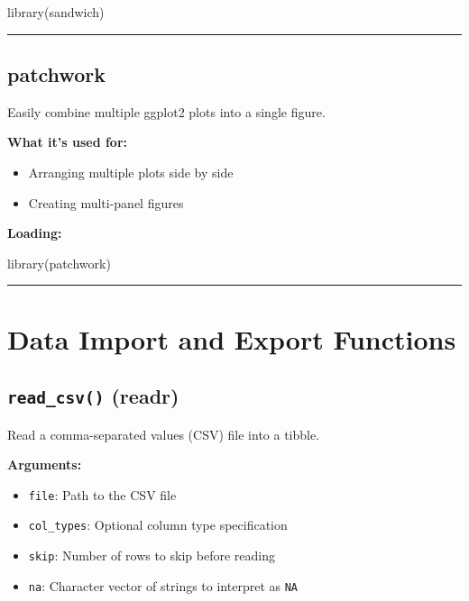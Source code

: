 \documentclass[
  letterpaper,
  DIV=11,
  numbers=noendperiod]{scrreprt}
\newenvironment{Shaded}{\begin{snugshade}}{\end{snugshade}}
\newcommand{\FunctionTok}[1]{\textcolor[rgb]{0.28,0.35,0.67}{#1}}
\newcommand{\NormalTok}[1]{\textcolor[rgb]{0.00,0.23,0.31}{#1}}
\providecommand{\tightlist}{%
  \setlength{\itemsep}{0pt}\setlength{\parskip}{0pt}}
\begin{document}
\begin{Shaded}
\begin{Highlighting}[]
\FunctionTok{library}\NormalTok{(sandwich)}
\end{Highlighting}
\end{Shaded}

\begin{center}\rule{0.5\linewidth}{0.5pt}\end{center}

\subsection{patchwork}\label{patchwork}

Easily combine multiple ggplot2 plots into a single figure.

\textbf{What it's used for:}

\begin{itemize}
\tightlist
\item
  Arranging multiple plots side by side
\item
  Creating multi-panel figures
\end{itemize}

\textbf{Loading:}

\begin{Shaded}
\begin{Highlighting}[]
\FunctionTok{library}\NormalTok{(patchwork)}
\end{Highlighting}
\end{Shaded}

\begin{center}\rule{0.5\linewidth}{0.5pt}\end{center}

\section{Data Import and Export
Functions}\label{data-import-and-export-functions}

\subsection{\texorpdfstring{\texttt{read\_csv()}
(readr)}{read\_csv() (readr)}}\label{read_csv-readr}

Read a comma-separated values (CSV) file into a tibble.

\textbf{Arguments:}

\begin{itemize}
\tightlist
\item
  \texttt{file}: Path to the CSV file
\item
  \texttt{col\_types}: Optional column type specification
\item
  \texttt{skip}: Number of rows to skip before reading
\item
  \texttt{na}: Character vector of strings to interpret as \texttt{NA}
\end{itemize}
\end{document}

